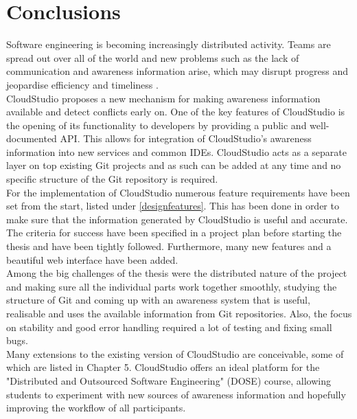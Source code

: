 

\chapter{Conclusions}\label{conclusions}






Software engineering is becoming increasingly distributed activity. Teams are spread out over all of the world and new problems such as the lack of communication and awareness information arise, which may disrupt progress and jeopardise efficiency and timeliness \cite{ref3}. \\

CloudStudio proposes a new mechanism for making awareness information available and detect conflicts early on. One of the key features of CloudStudio is the opening of its functionality to developers by providing a public and well-documented API. This allows for integration of CloudStudio's awareness information into new services and common IDEs. CloudStudio acts as a separate layer on top existing Git projects and as such can be added at any time and no specific structure of the Git repository is required. \\

For the implementation of CloudStudio numerous feature requirements have been set from the start, listed under \ref{designfeatures}. This has been done in order to make sure that the information generated by CloudStudio is useful and accurate. The criteria for success have been specified in a project plan before starting the thesis and have been tightly followed. Furthermore, many new features and a beautiful web interface have been added. \\

Among the big challenges of the thesis were the distributed nature of the project and making sure all the individual parts work together smoothly, studying the structure of Git and coming up with an awareness system that is useful, realisable and uses the available information from Git repositories. Also, the focus on stability and good error handling required a lot of testing and fixing small bugs. \\

Many extensions to the existing version of CloudStudio are conceivable, some of which are listed in Chapter 5. CloudStudio offers an ideal platform for the "Distributed and Outsourced Software Engineering" (DOSE) course, allowing students to experiment with new sources of awareness information and hopefully improving the workflow of all participants.



